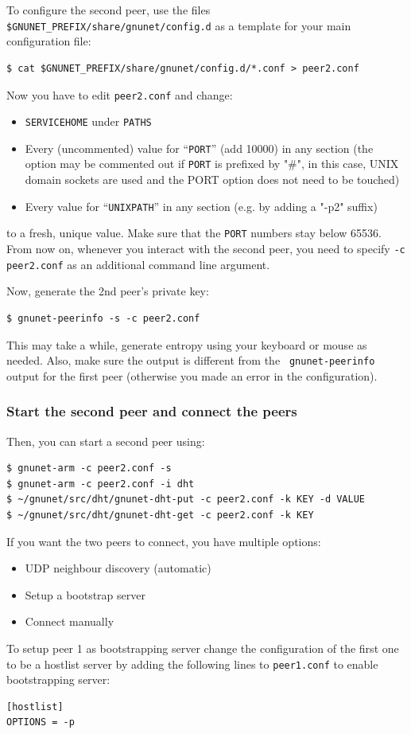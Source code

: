 \documentclass[10pt]{article}
\begin{document}
To configure the second peer, use the files {\tt
  \$GNUNET\_PREFIX/share/gnunet/config.d} as a template for your main
configuration file:
%
\lstset{language=bash}
\begin{lstlisting}
$ cat $GNUNET_PREFIX/share/gnunet/config.d/*.conf > peer2.conf
\end{lstlisting}
Now you have to edit {\tt peer2.conf} and change:
\begin{itemize}
  \itemsep0em
  \item{\texttt{SERVICEHOME} under \texttt{PATHS}}
  \item{Every (uncommented) value for ``\texttt{PORT}'' (add 10000) in any
        section (the option may be commented out if \texttt{PORT} is 
        prefixed by "\#", in this case, UNIX domain sockets are used
        and the PORT option does not need to be touched) }
  \item{Every value for ``\texttt{UNIXPATH}'' in any section (e.g. by adding a "-p2" suffix)}
\end{itemize}
to a fresh, unique value.  Make sure that the \texttt{PORT} numbers stay
below 65536.  From now on, whenever you interact with the second
peer, you need to specify {\tt -c peer2.conf} as an additional
command line argument.

Now, generate the 2nd peer's private key:

\lstset{language=bash}
\begin{lstlisting}
$ gnunet-peerinfo -s -c peer2.conf
\end{lstlisting}

This may take a while, generate entropy using your keyboard or mouse
as needed.  Also, make sure the output is different from the {\tt
  gnunet-peerinfo} output for the first peer (otherwise you made an
error in the configuration).

\subsubsection{Start the second peer and connect the peers}
Then, you can start a second peer using:
\lstset{language=bash}
\begin{lstlisting}
$ gnunet-arm -c peer2.conf -s
$ gnunet-arm -c peer2.conf -i dht
$ ~/gnunet/src/dht/gnunet-dht-put -c peer2.conf -k KEY -d VALUE
$ ~/gnunet/src/dht/gnunet-dht-get -c peer2.conf -k KEY
\end{lstlisting}
If you want the two peers to connect, you have multiple options:
\begin{itemize}
\itemsep0em
  \item UDP neighbour discovery (automatic)
  \item Setup a bootstrap server
  \item Connect manually
\end{itemize}
To setup peer 1 as bootstrapping server change the configuration of the first one to be a hostlist server by adding the following lines to \texttt{peer1.conf} to enable bootstrapping server:
 \begin{lstlisting}
[hostlist]
OPTIONS = -p
\end{lstlisting}
\end{document}
